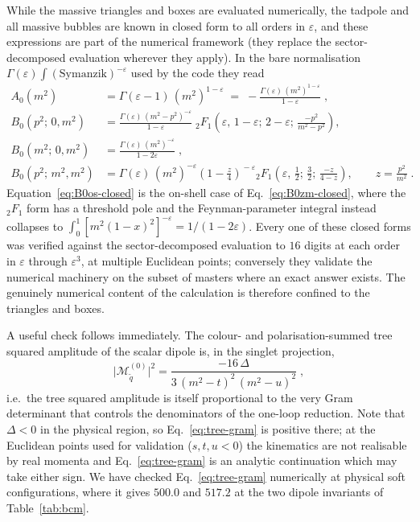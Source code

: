 \documentclass[11pt,a4paper]{article}
\newcommand{\eps}{\varepsilon}
\newcommand{\Bz}[2]{B_0(#1;\,#2)}
\newcommand{\Gram}{\Delta}
\begin{document}
While the massive triangles and boxes are evaluated numerically, the tadpole and
all massive bubbles are known in closed form to all orders in $\eps$, and
these expressions are part of the numerical framework (they replace the
sector-decomposed evaluation wherever they apply). In the bare normalisation
$\Gamma(\eps)\int(\text{Symanzik})^{-\eps}$ used by the code they read
\begin{align}
  A_0(m^2)&=\Gamma(\eps-1)\,(m^2)^{1-\eps}
   \;=\;-\frac{\Gamma(\eps)\,(m^2)^{1-\eps}}{1-\eps}\;,
  \label{eq:A0-closed}\\[1mm]
  \Bz{p^2}{0,m^2}&=\frac{\Gamma(\eps)\,(m^2-p^2)^{-\eps}}{1-\eps}\;
   {}_2F_1\!\left(\eps,\,1-\eps;\,2-\eps;\,\frac{-p^2}{m^2-p^2}\right),
  \label{eq:B0zm-closed}\\[1mm]
  \Bz{m^2}{0,m^2}&=\frac{\Gamma(\eps)\,(m^2)^{-\eps}}{1-2\eps}\;,
  \label{eq:B0os-closed}\\[1mm]
  \Bz{p^2}{m^2,m^2}&=\Gamma(\eps)\,(m^2)^{-\eps}
   \left(1-\frac{z}{4}\right)^{\!-\eps}
   {}_2F_1\!\left(\eps,\,\tfrac12;\,\tfrac32;\,\frac{-z}{4-z}\right),
   \qquad z=\frac{p^2}{m^2}\;.
  \label{eq:B0mm-closed}
\end{align}
Equation~\eqref{eq:B0os-closed} is the on-shell case of
Eq.~\eqref{eq:B0zm-closed}, where the ${}_2F_1$ form has a threshold pole and the
Feynman-parameter integral instead collapses to
$\int_0^1[m^2(1-x)^2]^{-\eps}=1/(1-2\eps)$. Every one of these closed forms was
verified against the sector-decomposed evaluation to $16$ digits at each order in
$\eps$ through $\eps^{3}$, at multiple Euclidean points; conversely they validate
the numerical machinery on the subset of masters where an exact answer exists.
The genuinely numerical content of the calculation is therefore confined to the
triangles and boxes.

A useful check follows immediately. The colour- and polarisation-summed
 {tree} squared amplitude of the scalar dipole is, in the singlet projection,
\begin{equation}
  \big|\mathcal{M}^{(0)}_{\tilde q}\big|^{2}
  =\frac{-16\,\Gram}{3\,(m^2-t)^2\,(m^2-u)^2}\;,
  \label{eq:tree-gram}
\end{equation}
i.e.\ the tree squared amplitude is itself proportional to the very Gram
determinant that controls the denominators of the one-loop reduction. Note that
$\Gram<0$ in the physical region, so Eq.~\eqref{eq:tree-gram} is positive there;
at the Euclidean points used for validation ($s,t,u<0$) the kinematics are not
realisable by real momenta and Eq.~\eqref{eq:tree-gram} is an analytic
continuation which may take either sign. We have checked
Eq.~\eqref{eq:tree-gram} numerically at physical soft configurations, where it
gives $500.0$ and $517.2$ at the two dipole invariants of Table~\ref{tab:bcm}.
\end{document}
